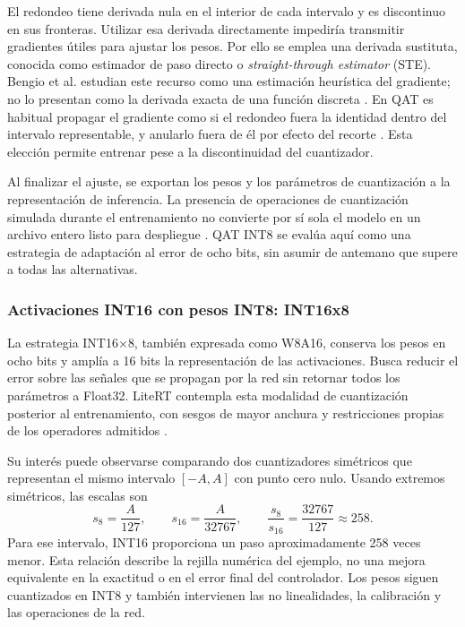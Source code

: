 El redondeo tiene derivada nula en el interior de cada intervalo y es discontinuo en sus fronteras. Utilizar esa derivada directamente impediría transmitir gradientes útiles para ajustar los pesos. Por ello se emplea una derivada sustituta, conocida como estimador de paso directo o \textit{straight-through estimator} (STE). Bengio et al. estudian este recurso como una estimación heurística del gradiente; no lo presentan como la derivada exacta de una función discreta \cite{bengio2013}. En QAT es habitual propagar el gradiente como si el redondeo fuera la identidad dentro del intervalo representable, y anularlo fuera de él por efecto del recorte \cite{nagel2021}. Esta elección permite entrenar pese a la discontinuidad del cuantizador.

Al finalizar el ajuste, se exportan los pesos y los parámetros de cuantización a la representación de inferencia. La presencia de operaciones de cuantización simulada durante el entrenamiento no convierte por sí sola el modelo en un archivo entero listo para despliegue \cite{tfqat}. QAT INT8 se evalúa aquí como una estrategia de adaptación al error de ocho bits, sin asumir de antemano que supere a todas las alternativas.

\subsubsection{Activaciones INT16 con pesos INT8: INT16x8}\label{sec:cap3_int16}
La estrategia INT16$\times$8, también expresada como W8A16, conserva los pesos en ocho bits y amplía a 16 bits la representación de las activaciones. Busca reducir el error sobre las señales que se propagan por la red sin retornar todos los parámetros a Float32. LiteRT contempla esta modalidad de cuantización posterior al entrenamiento, con sesgos de mayor anchura y restricciones propias de los operadores admitidos \cite{litert16}.

Su interés puede observarse comparando dos cuantizadores simétricos que representan el mismo intervalo $[-A,A]$ con punto cero nulo. Usando extremos simétricos, las escalas son
\begin{equation}
s_8=\frac{A}{127},\qquad s_{16}=\frac{A}{32767},\qquad
\frac{s_8}{s_{16}}=\frac{32767}{127}\approx258.
\end{equation}
Para ese intervalo, INT16 proporciona un paso aproximadamente 258 veces menor. Esta relación describe la rejilla numérica del ejemplo, no una mejora equivalente en la exactitud o en el error final del controlador. Los pesos siguen cuantizados en INT8 y también intervienen las no linealidades, la calibración y las operaciones de la red.

